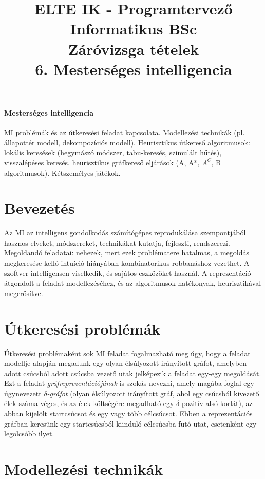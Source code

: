 \documentclass[margin=0px]{article}
\title{\textbf{{\Large ELTE IK - Programtervező Informatikus BSc} \vspace{0.2cm} \\ {\huge Záróvizsga tételek}} \vspace{0.3cm} \\ 6. Mesterséges intelligencia}
\author{}
\date{}
\newenvironment{tetel}[1]{\paragraph{#1 \\}}{}
\begin{document}
\maketitle

\begin{tetel}{Mesterséges intelligencia}
    MI problémák és az útkeresési feladat kapcsolata. Modellezési technikák (pl. állapottér modell, dekompozíciós modell). Heurisztikus útkereső algoritmusok: lokális keresések (hegymászó módszer, tabu-keresés, szimulált hűtés), visszalépéses keresés, heurisztikus gráfkereső eljárások (A, A*, $A^C$, B algoritmusok). Kétszemélyes játékok.
\end{tetel}

\section{Bevezetés}

Az MI az intelligens gondolkodás számítógépes reprodukálása szempontjából hasznos elveket, módszereket, technikákat kutatja, fejleszti, rendszerezi. Megoldandó feladatai: nehezek, mert ezek problématere hatalmas, a megoldás megkeresése kellő intuíció hiányában kombinatorikus robbanáshoz vezethet. A szoftver intelligensen viselkedik, és sajátos eszközöket használ. A reprezentáció átgondolt a feladat modellezéséhez, és az algoritmusok hatékonyak, heurisztikával megerősítve.

\section{Útkeresési problémák}

Útkeresési problémaként sok MI feladat fogalmazható meg úgy, hogy a feladat modellje alapján megadunk egy olyan élsúlyozott irányított gráfot, amelyben adott csúcsból adott csúcsba vezető utak jelképezik a feladat egy-egy megoldását. Ezt a feladat \textit{gráfreprezentációjának} is szokás nevezni, amely magába foglal egy úgynevezett \textit{$\delta$-gráfot} (olyan élsúlyozott irányított gráf, ahol egy csúcsból kivezető élek száma véges, és az élek költségére megadható egy $\delta$ pozitív alsó korlát), az abban kijelölt startcsúcsot és egy vagy több célcsúcsot. Ebben a reprezentációs gráfban keresünk egy startcsúcsból kiinduló célcsúcsba futó utat, esetenként egy legolcsóbb ilyet.

\section{Modellezési technikák}
\end{document}
